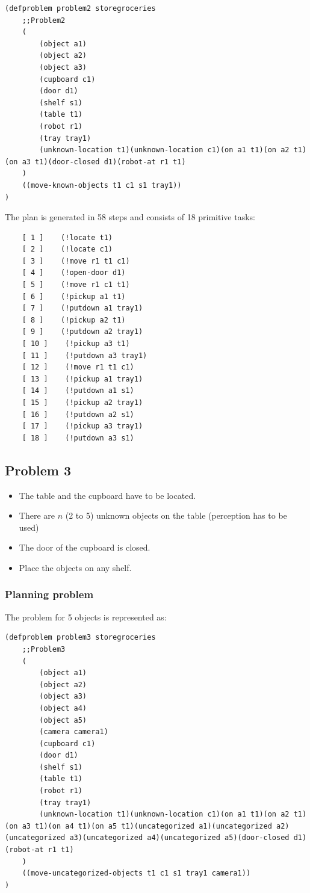 \documentclass[paper=a4, fontsize=11pt]{scrartcl}
\begin{document}
	\begin{lstlisting}
(defproblem problem2 storegroceries
	;;Problem2
	(
		(object a1)
		(object a2)
		(object a3)
		(cupboard c1)
		(door d1)
		(shelf s1)
		(table t1)
		(robot r1)
		(tray tray1)
		(unknown-location t1)(unknown-location c1)(on a1 t1)(on a2 t1)(on a3 t1)(door-closed d1)(robot-at r1 t1)
	)
	((move-known-objects t1 c1 s1 tray1))
)
	\end{lstlisting}
	
	\vspace{5mm}
	
	The plan is generated in 58 steps and consists of 18 primitive tasks: \\
	
	\begin{lstlisting}
	[ 1 ]    (!locate t1)
	[ 2 ]    (!locate c1)
	[ 3 ]    (!move r1 t1 c1)
	[ 4 ]    (!open-door d1)
	[ 5 ]    (!move r1 c1 t1)
	[ 6 ]    (!pickup a1 t1)
	[ 7 ]    (!putdown a1 tray1)
	[ 8 ]    (!pickup a2 t1)
	[ 9 ]    (!putdown a2 tray1)
	[ 10 ]    (!pickup a3 t1)
	[ 11 ]    (!putdown a3 tray1)
	[ 12 ]    (!move r1 t1 c1)
	[ 13 ]    (!pickup a1 tray1)
	[ 14 ]    (!putdown a1 s1)
	[ 15 ]    (!pickup a2 tray1)
	[ 16 ]    (!putdown a2 s1)
	[ 17 ]    (!pickup a3 tray1)
	[ 18 ]    (!putdown a3 s1)
	\end{lstlisting}
		
	\subsection{Problem 3}
	
		\begin{itemize}
			\item The table and the cupboard have to be located.
			\item There are $n$ (2 to 5) unknown objects on the table (perception has to be used)
			\item The door of the cupboard is closed.
			\item Place the objects on any shelf.
		\end{itemize}
	
	\subsubsection*{Planning problem}
	
	The problem for 5 objects is represented as: \\
	
	\begin{lstlisting}
(defproblem problem3 storegroceries
	;;Problem3
	(
		(object a1)
		(object a2)
		(object a3)
		(object a4)
		(object a5)
		(camera camera1)
		(cupboard c1)
		(door d1)
		(shelf s1)
		(table t1)
		(robot r1)
		(tray tray1)
		(unknown-location t1)(unknown-location c1)(on a1 t1)(on a2 t1)(on a3 t1)(on a4 t1)(on a5 t1)(uncategorized a1)(uncategorized a2)(uncategorized a3)(uncategorized a4)(uncategorized a5)(door-closed d1)(robot-at r1 t1)
	)
	((move-uncategorized-objects t1 c1 s1 tray1 camera1))
)
	\end{lstlisting}
	
\end{document}
